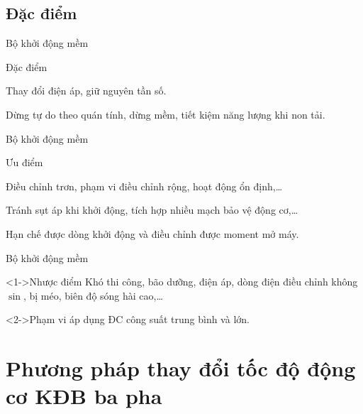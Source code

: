 \documentclass[20pt]{beamer}
\begin{document}
\subsection*{Đặc điểm}
\begin{frame}{Bộ khởi động mềm}
	\begin{block}{Đặc điểm}
		\begin{list}{--}{}
			\justifying
			\item Thay đổi điện áp, giữ nguyên tần số. 
			\item Dừng tự do theo quán tính, dừng mềm, tiết kiệm năng lượng khi non tải.
		\end{list}
	\end{block}
\end{frame}

\begin{frame}{Bộ khởi động mềm}
	\begin{block}{Ưu điểm}
		\begin{list}{--}{}
			\justifying
			\item Điều chỉnh trơn, phạm vi điều chỉnh rộng, hoạt động ổn định,\ldots
			\item Tránh sụt áp khi khởi động, tích hợp nhiều mạch bảo vệ động cơ,\ldots
			\item Hạn chế được dòng khởi động và điều chỉnh được moment mở máy.
		\end{list}
	\end{block}
\end{frame}

\begin{frame}{Bộ khởi động mềm}
	\justifying	
	\begin{block}<1->{Nhược điểm}
		Khó thi công, bão dưỡng, điện áp, dòng điện điều chỉnh không $\sin$, bị méo, biên độ sóng hài cao,\ldots
	\end{block}
	\begin{block}<2->{Phạm vi áp dụng}
		ĐC công suất trung bình và lớn.
	\end{block}
\end{frame}


\section[Thay đổi tốc độ động cơ KĐB ba pha]{Phương pháp thay đổi tốc độ động cơ KĐB ba pha}
\end{document}
